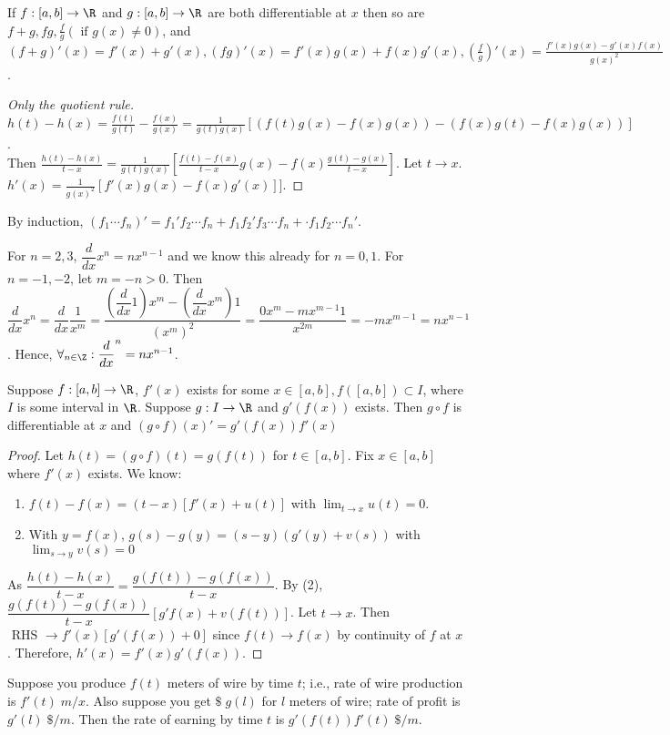 \begin{thm}[3]
	If $f:[a,b]\to \R$ and $g:[a,b]\to \R$ are both differentiable at $x$ then so are $f+g,fg,\frac{f}{g}(\text{ if } g(x)\neq 0)$, and $(f+g)'(x)=f'(x)+g'(x),(fg)'(x)=f'(x)g(x)+f(x)g'(x),(\frac{f}{g})'(x)=\frac{f'(x)g(x)-g'(x)f(x)}{g(x)^2}$. \end{thm}
\begin{proof}[Only the quotient rule]
	$h(t)-h(x)=\frac{f(t)}{g(t)}-\frac{f(x)}{g(x)}=\frac{1}{g(t)g(x)}[(f(t)g(x)-f(x)g(x))-(f(x)g(t)-f(x)g(x))]$.\\
	Then $\frac{h(t)-h(x)}{t-x}=\frac{1}{g(t)g(x)}\left[ \frac{f(t)-f(x)}{t-x}g(x)-f(x)\frac{g(t)-g(x)}{t-x} \right]$.
	Let $t\to x$. $h'(x)=\frac{1}{g(x)^2}\left[ f'(x)g(x)-f(x)g'(x) \right] ]$.
\end{proof}
\begin{remark}
	By induction, $(f_1\cdots f_n)'=f_1'f_2\cdots f_n+f_1 f_2'f_3\cdots f_n+ \cdot f_1 f_2 \cdots f_n'$.
	\begin{example}
		For $n=2,3$,
		$\dfrac{d}{dx}x^{n}=nx^{n-1}$ and we know this already for $n=0,1$.
		For $n=-1,-2$, let $m=-n>0$. Then $\dfrac{d}{dx}x^{n}=\dfrac{d}{dx}\dfrac{1}{x^{m}}=\dfrac{(\dfrac{d}{dx}1)x^{m}-(\dfrac{d}{dx}x^{m})1}{(x^{m})^2}=\dfrac{0x^{m}-mx^{m-1}1}{x^{2m}}=-mx^{m-1}=nx^{n-1}$. Hence, $\forall_{n \in \Z}: \dfrac{d}{dx}^{n}=nx^{n-1}$.
	\end{example}
\end{remark}

\begin{thm}
	Suppose $f:[a,b]\to \R$, $f'(x)$ exists for some $x \in [a,b], f([a,b]) \subset I$, where $I$ is some interval in $\R$. Suppose $g: I\to \R$ and $g'(f(x))$ exists. Then $g \circ f$ is differentiable at $x$ and $(g\circ f)(x)'=g'(f(x))f'(x)$
	\begin{proof}
		Let $h(t)=(g\circ f)(t)=g(f(t))$ for $t \in [a,b]$. Fix $x \in [a,b]$ where $f'(x)$ exists. We know:
		\begin{enumerate}
			\item $f(t)-f(x)=(t-x)[f'(x)+u(t)]$ with $\lim_{t\to x}{u(t)}=0$.
			\item With $y=f(x)$, $g(s)-g(y)=(s-y)(g'(y)+v(s))$ with $\lim_{s\to y}{v(s)}=0$
		\end{enumerate}
		As $\dfrac{h(t)-h(x)}{t-x}=\dfrac{g(f(t))-g(f(x))}{t-x}$. By (2), $\dfrac{g(f(t))-g(f(x))}{t-x}[g'f(x)+v(f(t))]$.
		Let $t\to x$. Then $\text{ RHS } \to f'(x)[g'(f(x))+0]$ since $f(t)\to f(x)$ by continuity of $f$ at $x$. Therefore, $h'(x)=f'(x)g'(f(x))$.
	\end{proof}
	\begin{note}
		Suppose you produce $f(t)$ meters of wire by time $t$; i.e., rate of wire production is $f'(t) \;m/x$. Also suppose you get $\$\; g(l)$ for $l$ meters of wire; rate of profit is $g'(l) \;\$/m$. Then the rate of earning by time $t$ is $g'(f(t))f'(t) \;\$/m$.
	\end{note}
\end{thm}

